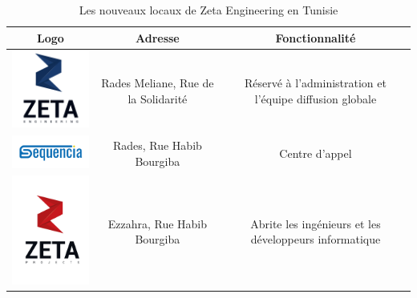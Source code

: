 \begin{table}[H]
\begin{center}
     \begin{tabular}{|c{5cm}|c{5cm}|c{5cm}|}
    \hline
	\textbf{Logo}         & \textbf{Adresse}   & \textbf{Fonctionnalité} \\
    \hline
    
	\includegraphics[width=4cm]{Images/logo-zeta1.png} & Rades Meliane, Rue de la Solidarité  & Réservé à l'administration et l'équipe diffusion globale  \\
	
 	\hline
 	
	\includegraphics[width=4cm]{Images/logo-Sequencia.png}   &  Rades, Rue Habib Bourgiba  &  Centre d'appel \\
	
	\hline
	
	\includegraphics[width=4cm]{Images/Logo-ZetaProject.png}  & Ezzahra, Rue Habib Bourgiba    & Abrite les ingénieurs et les développeurs informatique  \\
	
	\hline
	
     \end{tabular}
     \caption{Les nouveaux locaux de Zeta Engineering en Tunisie}
     \label{1}
     \end{center}
     \label{tab1}
\end{table}

